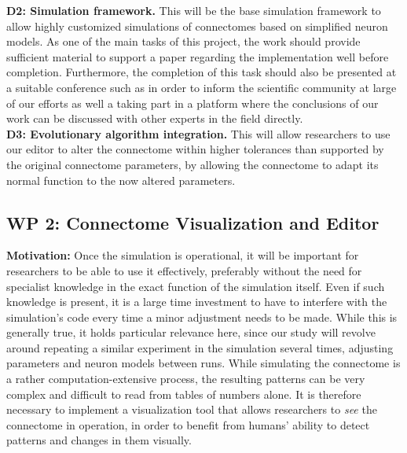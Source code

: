 \documentclass[a4paper,11pt]{article}
\begin{document}
\textbf{D2: Simulation framework.} This will be the base simulation framework to allow highly customized simulations of connectomes based on simplified neuron models. As one of the main tasks of this project, the work should provide sufficient material to support a paper regarding the implementation well before completion. Furthermore, the completion of this task should also be presented at a suitable conference such as  in order to inform the scientific community at large of our efforts as well a taking part in a platform where the conclusions of our work can be discussed with other experts in the field directly.
\\[0,2cm]

\textbf{D3: Evolutionary algorithm integration.} This will allow researchers to use our editor to alter the connectome within higher tolerances than supported by the original connectome parameters, by allowing the connectome to adapt its normal function to the now altered parameters. 
\\[0,2cm]

\subsection{WP 2: Connectome Visualization and Editor}

\citep{Bilitchenko2011}
\citep{Deursen2000}
\citep{Hudak1998}
\citep{Sedlmajer2012}


\textbf{Motivation:}
Once the simulation is operational, it will be important for researchers to be able to use it effectively, preferably without the need for specialist knowledge in the exact function of the simulation itself. Even if such knowledge is present, it is a large time investment to have to interfere with the simulation's code every time a minor adjustment needs to be made. While this is generally true, it holds particular relevance here, since our study will revolve around repeating a similar experiment in the simulation several times, adjusting parameters and neuron models between runs.
While simulating the connectome is a rather computation-extensive process, the resulting patterns can be very complex and difficult to read from tables of numbers alone. It is therefore necessary to implement a visualization tool that allows researchers to \emph{see} the connectome in operation, in order to benefit from humans' ability to detect patterns and changes in them visually.
\end{document}
